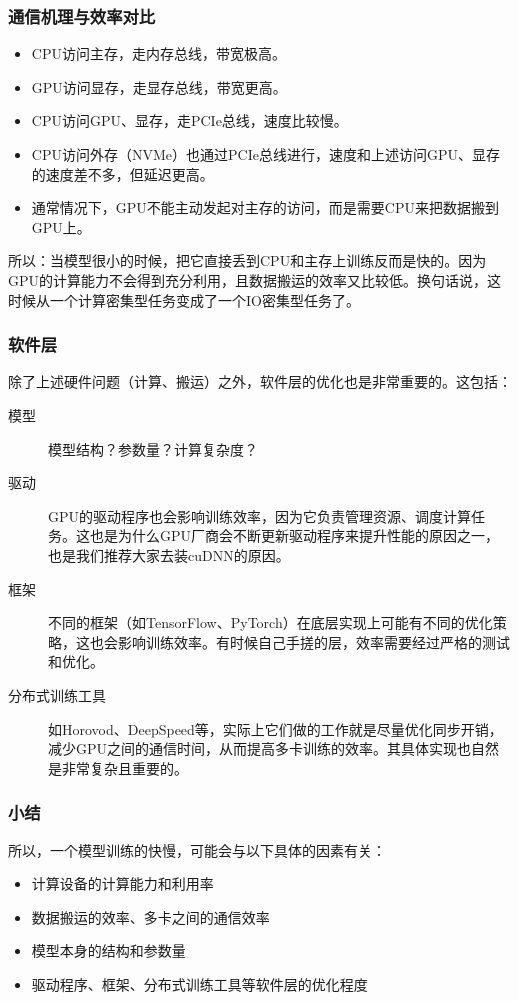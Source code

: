 \documentclass{ctexbeamer}
\begin{document}
\begin{frame}
    \frametitle{通信机理与效率对比}
    \begin{itemize}
        \item CPU访问主存，走内存总线，带宽极高。
        \item GPU访问显存，走显存总线，带宽更高。
        \item CPU访问GPU、显存，走PCIe总线，速度比较慢。
        \item CPU访问外存（NVMe）也通过PCIe总线进行，速度和上述访问GPU、显存的速度差不多，但延迟更高。
        \item 通常情况下，GPU不能主动发起对主存的访问，而是需要CPU来把数据搬到GPU上。
    \end{itemize}

    所以：当模型很小的时候，把它直接丢到CPU和主存上训练反而是快的。因为GPU的计算能力不会得到充分利用，且数据搬运的效率又比较低。换句话说，这时候从一个计算密集型任务变成了一个IO密集型任务了。

\end{frame}

\begin{frame}
    \frametitle{软件层}

    除了上述硬件问题（计算、搬运）之外，软件层的优化也是非常重要的。这包括：

    \begin{description}
        \item[模型] 模型结构？参数量？计算复杂度？
        \item[驱动] GPU的驱动程序也会影响训练效率，因为它负责管理资源、调度计算任务。这也是为什么GPU厂商会不断更新驱动程序来提升性能的原因之一，也是我们推荐大家去装cuDNN的原因。
        \item[框架] 不同的框架（如TensorFlow、PyTorch）在底层实现上可能有不同的优化策略，这也会影响训练效率。有时候自己手搓的层，效率需要经过严格的测试和优化。
        \item[分布式训练工具] 如Horovod、DeepSpeed等，实际上它们做的工作就是尽量优化同步开销，减少GPU之间的通信时间，从而提高多卡训练的效率。其具体实现也自然是非常复杂且重要的。
    \end{description}

\end{frame}

\begin{frame}
    \frametitle{小结}

    所以，一个模型训练的快慢，可能会与以下具体的因素有关：
    \begin{itemize}
        \item 计算设备的计算能力和利用率
        \item 数据搬运的效率、多卡之间的通信效率
        \item 模型本身的结构和参数量
        \item 驱动程序、框架、分布式训练工具等软件层的优化程度
    \end{itemize}

\end{frame}
\end{document}
